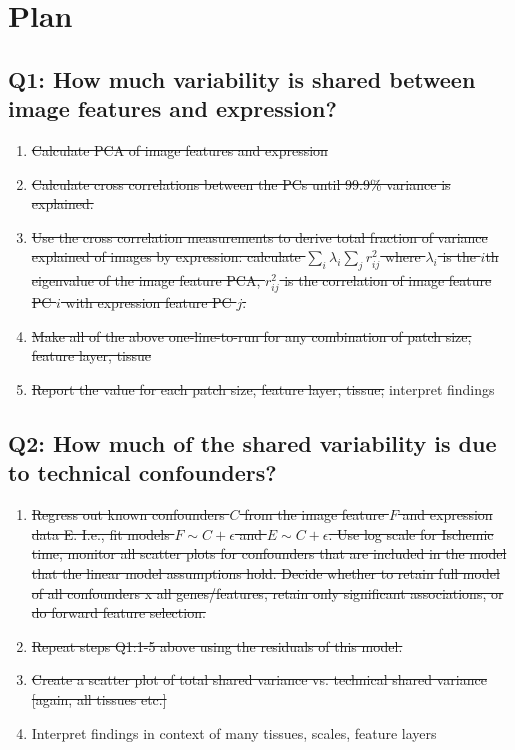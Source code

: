 \documentclass{article}
\begin{document}
\section*{Plan}

\subsection*{Q1: How much variability is shared between image features and expression?} 
\begin{enumerate}
\item \sout{Calculate PCA of image features and expression}

\item \sout{Calculate cross correlations between the PCs until 99.9\% variance is explained.}

\item \sout{Use the cross correlation measurements to derive total fraction of variance explained of images by expression: calculate $\sum_i \lambda_i \sum_j r^2_{ij} $ where $\lambda_i$ is the $i$th eigenvalue of the image feature PCA, $r^2_{ij}$ is the correlation of image feature PC $i$ with expression feature PC $j$.}

\item \sout{Make all of the above one-line-to-run for any combination of patch size, feature layer, tissue}

\item \sout{Report the value for each patch size, feature layer, tissue;} interpret findings

\end{enumerate}

\subsection*{Q2: How much of the shared variability is due to technical confounders?} 

\begin{enumerate}
\item \sout{Regress out known confounders $C$ from the image feature $F$ and expression data E. I.e., fit models $F \sim C + \epsilon$ and $E \sim C + \epsilon$. Use log scale for Ischemic time, monitor all scatter plots for confounders that are included in the model that the linear model assumptions hold. Decide whether to retain full model of all confounders x all genes/features, retain only significant associations, or do forward feature selection.}

\item \sout{Repeat steps Q1:1-5 above using the residuals of this model. }

\item \sout{Create a scatter plot of total shared variance vs. technical shared variance [again, all tissues etc.]}

\item Interpret findings in context of many tissues, scales, feature layers
\end{enumerate}
\end{document}
